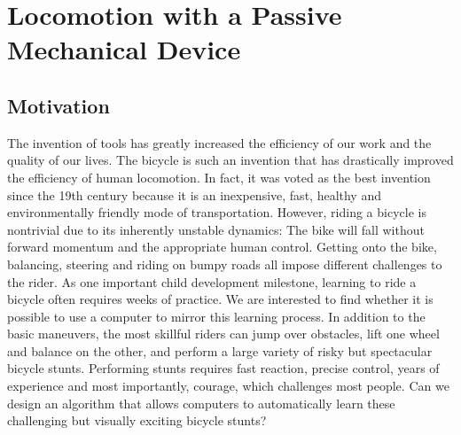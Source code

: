 \chapter{Locomotion with a Passive Mechanical Device}
\section{Motivation}

The invention of tools has greatly increased the efficiency of our work and the quality of our lives. The bicycle is such an invention that has drastically improved the efficiency of human locomotion. In fact, it was voted as the best invention since the 19th century \cite{BBC2005} because it is an inexpensive, fast, healthy and environmentally friendly mode of transportation. However, riding a bicycle is nontrivial due to its inherently unstable dynamics: The bike will fall without forward momentum and the appropriate human control. Getting onto the bike, balancing, steering and riding on bumpy roads all impose different challenges to the rider. As one important child development milestone, learning to ride a bicycle often requires weeks of practice. We are interested to find whether it is possible to use a computer to mirror this learning process. In addition to the basic maneuvers, the most skillful riders can jump over obstacles, lift one wheel and balance on the other, and perform a large variety of risky but spectacular bicycle stunts. Performing stunts requires fast reaction, precise control, years of experience and most importantly, courage, which challenges most people. Can we design an algorithm that allows computers to automatically learn these challenging but visually exciting bicycle stunts?

